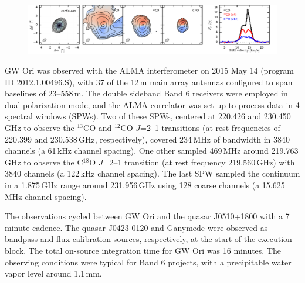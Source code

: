 \documentclass[twocolumn]{aastex61}
\begin{document}
\begin{figure}[ht!]
\begin{center}
  \includegraphics[width=\linewidth]{moments.pdf}
  \end{center}
\end{figure}

GW Ori was observed with the ALMA interferometer on 2015 May 14 (program ID 2012.1.00496.S), with 37 of the 12\,m main array antennas configured to span baselines of 23--558\,m.  The double sideband Band 6 receivers were employed in dual polarization mode, and the ALMA correlator was set up to process data in 4 spectral windows (SPWs).  Two of these SPWs, centered at 220.426 and 230.450\,GHz to observe the $^{13}$CO and $^{12}$CO $J$=2--1 transitions (at rest frequencies of 220.399 and 230.538\,GHz, respectively), covered 234\,MHz of bandwidth in 3840 channels (a 61\,kHz channel spacing).  One other sampled 469\,MHz around 219.763\,GHz to observe the C$^{18}$O $J$=2--1 transition (at rest frequency 219.560\,GHz) with 3840 channels (a 122\,kHz channel spacing).  The last SPW sampled the continuum in a 1.875\,GHz range around 231.956\,GHz using 128 coarse channels (a 15.625\,MHz channel spacing).

The observations cycled between GW Ori and the quasar J0510+1800 with a 7 minute cadence.  The quasar J0423-0120 and Ganymede were observed as bandpass and flux calibration sources, respectively, at the start of the execution block.  The total on-source integration time for GW Ori was 16 minutes.  The observing conditions were typical for Band 6 projects, with a precipitable water vapor level around 1.1\,mm.
\end{document}
